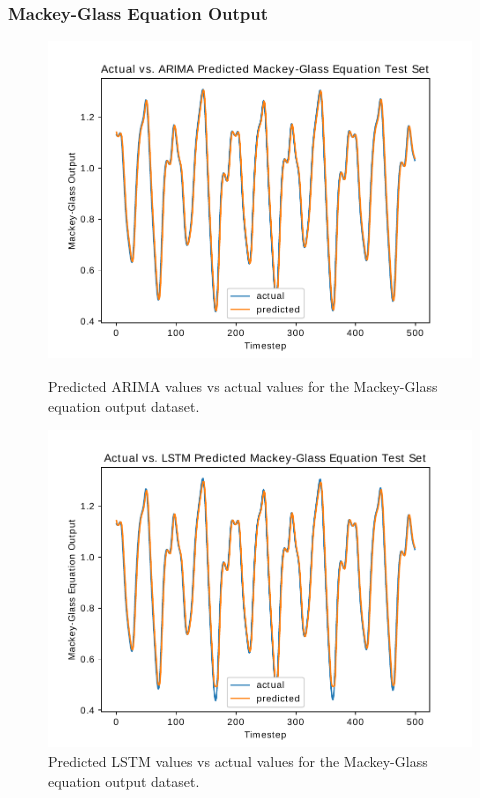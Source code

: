 \documentclass{article}
\begin{document}
\subsubsection{Mackey-Glass Equation Output}
\begin{figure}
\centering
{}
	\centering
  \includegraphics[scale=0.28]{imgs/arima_results_mackey.pdf}
  \caption{Predicted ARIMA values vs actual values for the Mackey-Glass equation output dataset.}\label{fig:mackey_graph_arima}
\endminipage\hfill
{}
	\centering
  \includegraphics[scale=0.28]{imgs/lstm_results_mackey.pdf}
  \caption{Predicted LSTM values vs actual values for the Mackey-Glass equation output dataset.}\label{fig:mackey_graph_lstm}

\end{figure}
\end{document}

